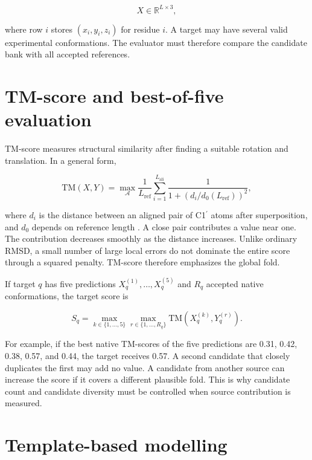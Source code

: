 \documentclass[12pt,a4paper,oneside]{report}
\newcommand{\cprime}{C1$^{\prime}$}
\begin{document}
\begin{equation}
X\in\mathbb{R}^{L\times 3},
\end{equation}

where row $i$ stores $(x_i,y_i,z_i)$ for residue $i$. A target may have several valid
experimental conformations. The evaluator must therefore compare the candidate bank
with all accepted references.

\section{TM-score and best-of-five evaluation}

TM-score measures structural similarity after finding a suitable rotation and
translation. In a general form,

\begin{equation}
\mathrm{TM}(X,Y)=\max_{\mathcal{A}}
\frac{1}{L_{\mathrm{ref}}}
\sum_{i=1}^{L_{\mathrm{ali}}}
\frac{1}{1+\left(d_i/d_0(L_{\mathrm{ref}})\right)^2},
\end{equation}

where $d_i$ is the distance between an aligned pair of \cprime{} atoms after
superposition, and $d_0$ depends on reference length \cite{tm_score,usalign}. A close
pair contributes a value near one. The contribution decreases smoothly as the distance
increases. Unlike ordinary RMSD, a small number of large local errors do not dominate
the entire score through a squared penalty. TM-score therefore emphasizes the global
fold.

If target $q$ has five predictions $X_q^{(1)},\ldots,X_q^{(5)}$ and $R_q$ accepted
native conformations, the target score is

\begin{equation}
S_q=\max_{k\in\{1,\ldots,5\}}
\max_{r\in\{1,\ldots,R_q\}}
\mathrm{TM}\left(X_q^{(k)},Y_q^{(r)}\right).
\end{equation}

For example, if the best native TM-scores of the five predictions are 0.31, 0.42,
0.38, 0.57, and 0.44, the target receives 0.57. A second candidate that closely
duplicates the first may add no value. A candidate from another source can increase
the score if it covers a different plausible fold. This is why candidate count and
candidate diversity must be controlled when source contribution is measured.

\section{Template-based modelling}
\end{document}
